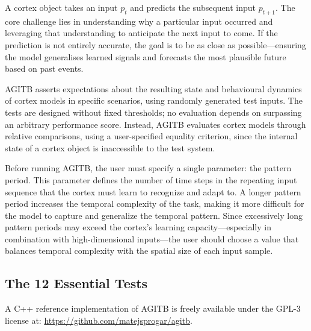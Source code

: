 \documentclass{article}
\begin{document}
A cortex object takes an input $p_t$ and predicts the subsequent input $p_{t+1}$. The core challenge lies in understanding why a particular input occurred and leveraging that understanding to anticipate the next input to come. If the prediction is not entirely accurate, the goal is to be as close as possible—ensuring the model generalises learned signals and forecasts the most plausible future based on past events.

AGITB asserts expectations about the resulting state and behavioural dynamics of cortex models in specific scenarios, using randomly generated test inputs. The tests are designed without fixed thresholds; no evaluation depends on surpassing an arbitrary performance score. Instead, AGITB evaluates cortex models through relative comparisons, using a user-specified equality criterion, since the internal state of a cortex object is inaccessible to the test system.

Before running AGITB, the user must specify a single parameter: the pattern period. This parameter defines the number of time steps in the repeating input sequence that the cortex must learn to recognize and adapt to. A longer pattern period increases the temporal complexity of the task, making it more difficult for the model to capture and generalize the temporal pattern. Since excessively long pattern periods may exceed the cortex’s learning capacity—especially in combination with high-dimensional inputs—the user should choose a value that balances temporal complexity with the spatial size of each input sample.

\subsection{The 12 Essential Tests}

A C++ reference implementation of AGITB is freely available under the GPL-3 license at: \url{https://github.com/matejsprogar/agitb}.
\end{document}
